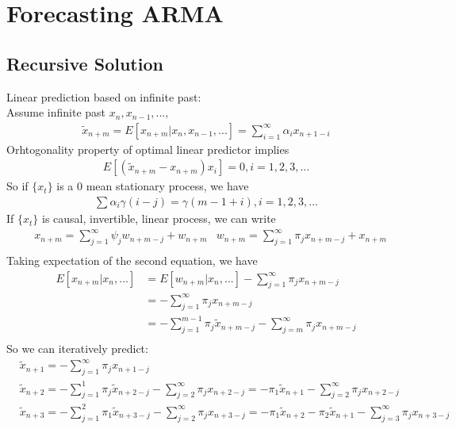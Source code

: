 \section{Forecasting ARMA} 
\subsection{Recursive Solution}
Linear prediction based on infinite past: \\
Assume infinite past $x_n, x_{n-1}, ..., $
    \begin{align*}
        \tilde{x}_{n+m} = E[x_{n+m} | x_n,x_{n-1}, ... ] = \sum_{i=1}^\infty \alpha_i x_{n+1-i}
    \end{align*}
Orhtogonality property of optimal linear predictor implies
    \begin{align*}
        E[(\tilde{x}_{n+m} - x_{n+m})x_i] = 0, i = 1,2,3,...
    \end{align*}
So if $\{ x_t \}$ is a 0 mean stationary process, we have 
    \begin{align*}
        \sum \alpha_i \gamma(i-j) = \gamma(m-1+i), i = 1,2,3,...
    \end{align*}
If $\{ x_t \}$ is causal, invertible, linear process, we can write 
    \begin{align*}
        & x_{n+m} = \sum_{j=1}^\infty \psi_j w_{n+m-j} + w_{n+m} & w_{n+m} = \sum_{j=1}^\infty \pi_j x_{n+m-j} + x_{n+m}\\
    \end{align*}
Taking expectation of the second equation, we have 
    \begin{align*}
        E[x_{n+m} | x_n, ...] 
        & = E[w_{n+m} | x_n, ...] - \sum_{j=1}^\infty \pi_j x_{n+m-j} \\
        & = - \sum_{j=1}^\infty \pi_j x_{n+m-j} \\
        & = -\sum_{j=1}^{m-1} \pi_j \tilde{x}_{n+m-j} - \sum_{j=m}^\infty \pi_j x_{n+m-j}\\
        & \tag{Notice the second part contains observed value} 
    \end{align*}
So we can iteratively predict: 
    \begin{align*}
        & \tilde{x}_{n+1} = - \sum_{j=1}^\infty \pi_j x_{n+1-j}\\
        & \tilde{x}_{n+2} = - \sum_{j=1}^1 \pi_j \tilde{x}_{n+2-j} -  \sum_{j=2}^\infty \pi_j x_{n+2-j} = -\pi_1 \tilde{x}_{n+1} - \sum_{j=2}^\infty \pi_j x_{n+2-j}\\
        & \tilde{x}_{n+3} = - \sum_{j=1}^2 \pi_1 \tilde{x}_{n+3-j} -  \sum_{j=2}^\infty \pi_j x_{n+3-j} = -\pi_1 \tilde{x}_{n+2} - \pi_2 \tilde{x}_{n+1} - \sum_{j=3}^\infty \pi_j x_{n+3-j}
    \end{align*}

